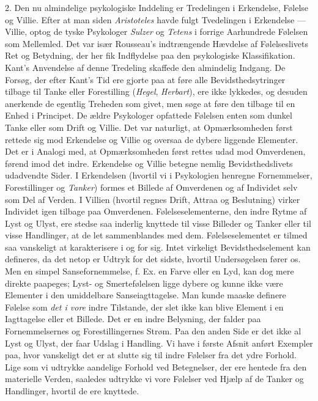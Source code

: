\documentclass[12pt,a4paper,openany]{book}
\newcommand{\opage}[1]{\marginnote{\footnotesize\textit{[#1]}}}
\begin{document}
2. Den nu almindelige psykologiske Inddeling er Tredelingen i
Erkendelse, Følelse og Villie. Efter at man siden \emph{Aristoteles}
havde fulgt Tvedelingen i Erkendelse --- Villie, optog de tyske
Psykologer \emph{Sulzer} og \emph{Tetens} i forrige Aarhundrede Følelsen
som Mellemled. Det var især Rousseau’s indtrængende Hævdelse af
Følelseslivets Ret og Betydning, der her fik Indflydelse paa den
psykologiske Klassifikation. Kant’s Anvendelse af denne Tredeling
skaffede den almindelig Indgang. De Forsøg, der efter Kant’s Tid ere
gjorte paa at føre alle Bevidsthedsytringer tilbage til Tanke eller
Forestilling (\emph{Hegel}, \emph{Herbart}), ere ikke lykkedes, og
desuden anerkende de egentlig Treheden som givet, men søge at føre den
tilbage til en Enhed i Principet. De ældre Psykologer opfattede Følelsen
enten som dunkel Tanke eller som Drift og Villie. Det var naturligt, at
Opmærksomheden først rettede sig mod Erkendelse og Villie og oversaa de
dybere liggende Elementer. Det er i Analogi med, at Opmærksomheden først
rettes udad mod Omverdenen, førend imod det indre. Erkendelse og Villie
betegne nemlig Bevidsthedslivets udadvendte Sider. I Erkendelsen
(hvortil vi i Psykologien henregne Fornemmelser, Forestillinger og
\emph{Tanker}) formes et Billede af Omverdenen og af Individet selv som
Del af Verden. I Villien (hvortil regnes Drift, Attraa og Beslutning)
virker Individet igen tilbage paa Omverdenen. Følelseselementerne, den
indre Rytme af Lyst og Ulyst, ere stedse saa inderlig knyttede til visse
Billeder og Tanker eller til visse Handlinger, at de let sammenblandes
med dem. Følelseselementet er tilmed saa vanskeligt at karakterisere i
og for sig. Intet virkeligt Bevidsthedselement kan defineres, da det
netop er Udtryk for det sidste, hvortil Undersøgelsen fører os. Men en
simpel Sansefornemmelse, f. Ex. en Farve eller en Lyd, kan dog mere
direkte paapeges; Lyst- og Smertefølelsen ligge dybere og kunne ikke
være Elementer i den umiddelbare Sanseiagttagelse. Man kunde maaske
definere Følelse som \emph{det i vore} indre Tilstande, der slet ikke
kan blive Element i en Iagttagelse eller et Billede. Det er en indre
Belysning, der falder paa Fornemmelsernes og Forestillingernes Strøm.
Paa den
\opage{106}anden Side er det ikke al Lyst og Ulyst, der faar Udslag i
Handling. Vi have i første Afsnit anført Exempler paa, hvor vanskeligt
det er at slutte sig til indre Følelser fra det ydre Forhold. Lige som
vi udtrykke aandelige Forhold ved Betegnelser, der ere hentede fra den
materielle Verden, saaledes udtrykke vi vore Følelser ved Hjælp af de
Tanker og Handlinger, hvortil de ere knyttede.
\end{document}
